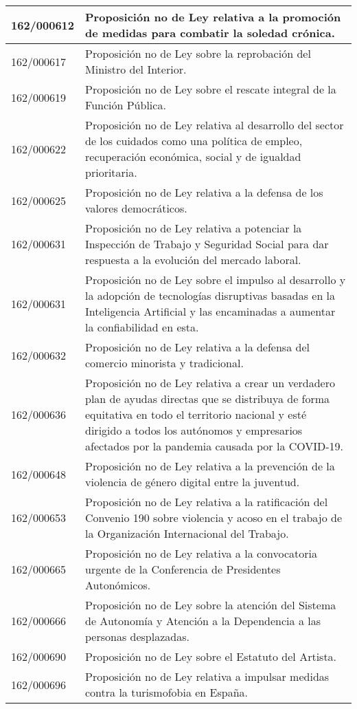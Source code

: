 {\begin{table}[H]
\begin{center}
\begin{tabularx}{\linewidth}{| l | X |}
\hline
162/000612 & Proposición no de Ley relativa a la promoción de medidas para combatir la soledad crónica. \\
\hline
162/000617 & Proposición no de Ley sobre la reprobación del Ministro del Interior. \\
\hline
162/000619 & Proposición no de Ley sobre el rescate integral de la Función Pública. \\
\hline
162/000622 & Proposición no de Ley relativa al desarrollo del sector de los cuidados como una política de empleo, recuperación económica, social y de igualdad prioritaria. \\
\hline
162/000625 & Proposición no de Ley relativa a la defensa de los valores democráticos. \\
\hline
162/000631 & Proposición no de Ley relativa a potenciar la Inspección de Trabajo y Seguridad Social para dar respuesta a la evolución del mercado laboral. \\
\hline
162/000631 & Proposición no de Ley sobre el impulso al desarrollo y la adopción de tecnologías disruptivas basadas en la Inteligencia Artificial y las encaminadas a aumentar la confiabilidad en esta. \\
\hline
162/000632 & Proposición no de Ley relativa a la defensa del comercio minorista y tradicional. \\
\hline
162/000636 & Proposición no de Ley relativa a crear un verdadero plan de ayudas directas que se distribuya de forma equitativa en todo el territorio nacional y esté dirigido a todos los autónomos y empresarios afectados por la pandemia causada por la COVID-19. \\
\hline
162/000648 & Proposición no de Ley relativa a la prevención de la violencia de género digital entre la juventud. \\
\hline
162/000653 & Proposición no de Ley relativa a la ratificación del Convenio 190 sobre violencia y acoso en el trabajo de la Organización Internacional del Trabajo. \\
\hline
162/000665 & Proposición no de Ley relativa a la convocatoria urgente de la Conferencia de Presidentes Autonómicos. \\
\hline
162/000666 & Proposición no de Ley sobre la atención del Sistema de Autonomía y Atención a la Dependencia a las personas desplazadas. \\
\hline
162/000690 & Proposición no de Ley sobre el Estatuto del Artista. \\
\hline
162/000696 & Proposición no de Ley relativa a impulsar medidas contra la turismofobia en España. \\

\end{tabularx}
\end{center}
\end{table}}
